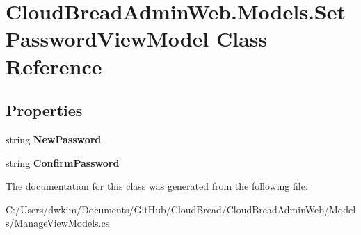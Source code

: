 \hypertarget{class_cloud_bread_admin_web_1_1_models_1_1_set_password_view_model}{}\section{Cloud\+Bread\+Admin\+Web.\+Models.\+Set\+Password\+View\+Model Class Reference}
\label{class_cloud_bread_admin_web_1_1_models_1_1_set_password_view_model}
\subsection*{Properties}
\begin{DoxyCompactItemize}
\item 
string {\bfseries New\+Password}\hypertarget{class_cloud_bread_admin_web_1_1_models_1_1_set_password_view_model_aeede5ee6b5e6a27233330f2994f405b5}{}\label{class_cloud_bread_admin_web_1_1_models_1_1_set_password_view_model_aeede5ee6b5e6a27233330f2994f405b5}

\item 
string {\bfseries Confirm\+Password}\hypertarget{class_cloud_bread_admin_web_1_1_models_1_1_set_password_view_model_ada1a448bd5c04747a344a8ae820d2757}{}\label{class_cloud_bread_admin_web_1_1_models_1_1_set_password_view_model_ada1a448bd5c04747a344a8ae820d2757}

\end{DoxyCompactItemize}


The documentation for this class was generated from the following file\+:\begin{DoxyCompactItemize}
\item 
C\+:/\+Users/dwkim/\+Documents/\+Git\+Hub/\+Cloud\+Bread/\+Cloud\+Bread\+Admin\+Web/\+Models/Manage\+View\+Models.\+cs\end{DoxyCompactItemize}
